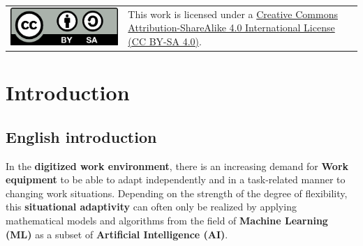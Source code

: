 \documentclass [oneside,10pt,a4paper,ngerman,BCOR10mm,headsepline,parindent,final]{scrartcl}
\begin{document}
    \noindent
    \begin{tabular}{l l}
    \begin{minipage}{0.24\textwidth}
        \includegraphics{images/CC_BY-SA_40.png}
    \end{minipage}
    &
    \begin{minipage}{0.68\textwidth}
        This work is licensed under a \href{https://creativecommons.org/licenses/by-sa/4.0/}{Creative Commons Attribution-ShareAlike 4.0 International License (CC BY-SA 4.0)}.
    \end{minipage}
    \end{tabular}

    \newpage

    \pagestyle{fancy}
    \fancyhf{}
    \fancyhead[ER,OR]{\leftmark}

    \renewcommand{\sectionmark}[1]{
        \markboth{\thesection{} #1}{}
    }

    
    \tableofcontents
    
    


    
    \hypertarget{introduction}{%
\section{Introduction}\label{introduction}}

    \hypertarget{english-introduction}{%
\subsection{English introduction}\label{english-introduction}}

In the \textbf{digitized work environment}, there is an increasing
demand for \textbf{Work equipment} to be able to adapt independently and
in a task-related manner to changing work situations. Depending on the
strength of the degree of flexibility, this \textbf{situational
adaptivity} can often only be realized by applying mathematical models
and algorithms from the field of \textbf{Machine Learning (ML)} as a
subset of \textbf{Artificial Intelligence (AI)}.
\end{document}
